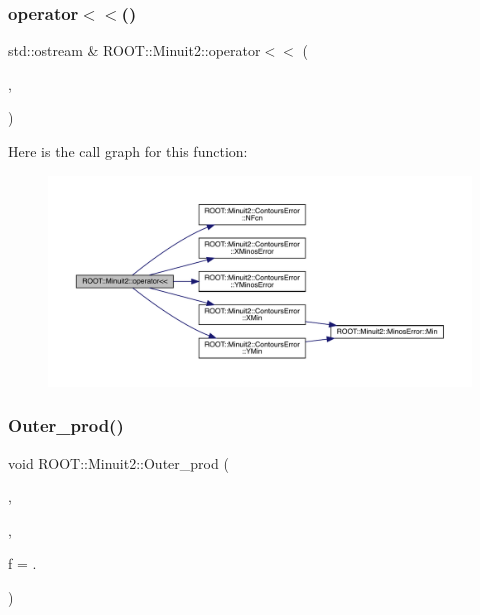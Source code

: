 \subsubsection{\texorpdfstring{operator$<$$<$()}{operator<<()}\hspace{0.1cm}{\footnotesize\ttfamily [11/11]}}
{\footnotesize\ttfamily std\+::ostream \& R\+O\+O\+T\+::\+Minuit2\+::operator$<$$<$ (\begin{DoxyParamCaption}\item[{std\+::ostream \&}]{,  }\item[{const \mbox{\hyperlink{classROOT_1_1Minuit2_1_1ContoursError}{Contours\+Error}} \&}]{ }\end{DoxyParamCaption})}

Here is the call graph for this function\+:\nopagebreak
\begin{figure}[H]
\begin{center}
\leavevmode
\includegraphics[width=350pt]{d6/d3a/namespaceROOT_1_1Minuit2_a5f32b6f73f8b284fbc74fbf211a7b4ac_cgraph}
\end{center}
\end{figure}
\mbox{\label{namespaceROOT_1_1Minuit2_ac07a37ec0cf04b47c95ddc6943487ef2}} 
\subsubsection{\texorpdfstring{Outer\_prod()}{Outer\_prod()}}
{\footnotesize\ttfamily void R\+O\+O\+T\+::\+Minuit2\+::\+Outer\+\_\+prod (\begin{DoxyParamCaption}\item[{\mbox{\hyperlink{classROOT_1_1Minuit2_1_1LASymMatrix}{L\+A\+Sym\+Matrix}} \&}]{,  }\item[{const \mbox{\hyperlink{classROOT_1_1Minuit2_1_1LAVector}{L\+A\+Vector}} \&}]{,  }\item[{double}]{f = {.} }\end{DoxyParamCaption})}

